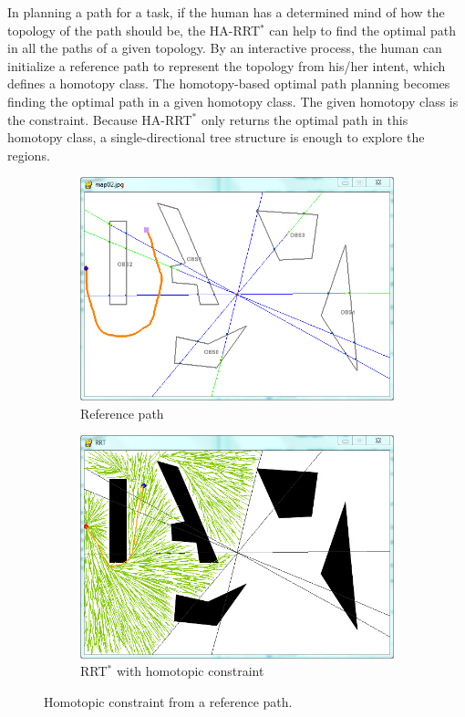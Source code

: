 \documentclass[letterpaper, 10 pt, conference]{ieeeconf}
\begin{document}
In planning a path for a task, if the human has a determined mind of how the topology of the path should be, the HA-RRT$^{*}$ can help to find the optimal path in all the paths of a given topology.
By an interactive process, the human can initialize a reference path to represent the topology from his/her intent, which defines a homotopy class.
The homotopy-based optimal path planning becomes finding the optimal path in a given homotopy class.
The given homotopy class is the constraint.
Because HA-RRT$^{*}$ only returns the optimal path in this homotopy class, a single-directional tree structure is enough to explore the regions.

\begin{figure}
	\centering
	\begin{subfigure}[t]{0.47\linewidth}
		\centering
		\includegraphics[width=\textwidth]{fig/referenceHomotopy.png}
		\caption{Reference path}
		\label{fig:reference_path:reference}
	\end{subfigure}  
	\begin{subfigure}[t]{0.47\linewidth}
		\centering
		\includegraphics[width=\textwidth]{fig/homotopicConstrainedRRT.png}
		\caption{RRT$^{*}$ with homotopic constraint}
		\label{fig:reference_path:rrt}
	\end{subfigure}   
	\caption{Homotopic constraint from a reference path.}
	\label{fig:reference_path}
\end{figure}
\end{document}
